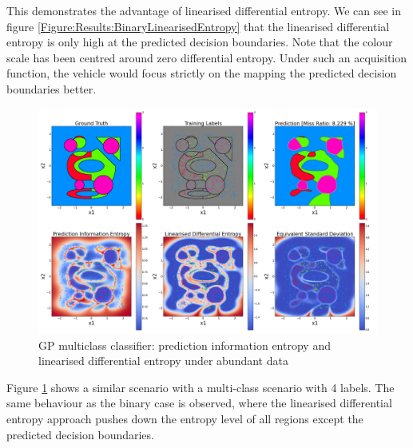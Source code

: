 \documentclass{article}
\begin{document}
		This demonstrates the advantage of linearised differential entropy. We can see in figure \ref{Figure:Results:BinaryLinearisedEntropy} that the linearised differential entropy is only high at the predicted decision boundaries. Note that the colour scale has been centred around zero differential entropy. Under such an acquisition function, the vehicle would focus strictly on the mapping the predicted decision boundaries better.
		
		\begin{figure}[!htbp]
		\centering
			\includegraphics[width = \linewidth]{Figures/multiclass_linearised_entropy_horizontal/Figure1.png}
		\caption{GP multiclass classifier: prediction information entropy and linearised differential entropy under abundant data}
		\label{Figure:Results:MulticlassLinearisedEntropy}
		\end{figure}
		
		Figure \ref{Figure:Results:MulticlassLinearisedEntropy} shows a similar scenario with a multi-class scenario with 4 labels. The same behaviour as the binary case is observed, where the linearised differential entropy approach pushes down the entropy level of all regions except the predicted decision boundaries.
		
		
\end{document}
